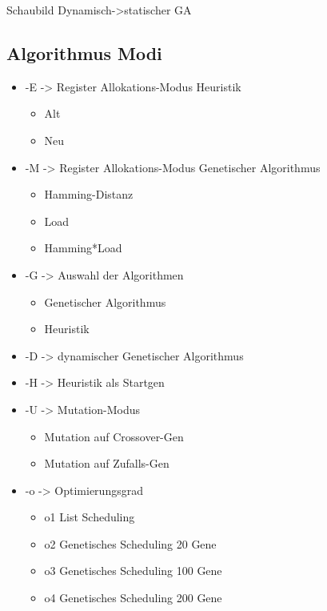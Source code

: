 Schaubild Dynamisch->statischer GA
 
\newpage
\subsection{Algorithmus Modi}
\begin{itemize}
	 \setlength{\itemsep}{-6pt}
	\item-E -> Register Allokations-Modus Heuristik
			\begin{itemize}
				\setlength{\itemsep}{-4pt}
				\item Alt
				\item Neu
			\end{itemize}
	\item-M -> Register Allokations-Modus Genetischer Algorithmus
		\begin{itemize}
			\setlength{\itemsep}{-4pt}
			\item Hamming-Distanz
			\item Load
			\item Hamming*Load
		\end{itemize}
	\item-G -> Auswahl der Algorithmen
			\begin{itemize}
				\setlength{\itemsep}{-4pt}
				\item Genetischer Algorithmus
				\item Heuristik
			\end{itemize}
	\item-D -> dynamischer Genetischer Algorithmus
	\item-H -> Heuristik als Startgen
	\item-U -> Mutation-Modus
				\begin{itemize}
					\setlength{\itemsep}{-4pt}
					\item Mutation auf Crossover-Gen
					\item Mutation auf Zufalls-Gen
				\end{itemize}
	\item-o -> Optimierungsgrad
			\begin{itemize}
				\setlength{\itemsep}{-4pt}
				\item o1 List Scheduling
				\item o2 Genetisches Scheduling 20 Gene
				\item o3 Genetisches Scheduling 100 Gene
				\item o4 Genetisches Scheduling 200 Gene
			\end{itemize}
	
\end{itemize}


